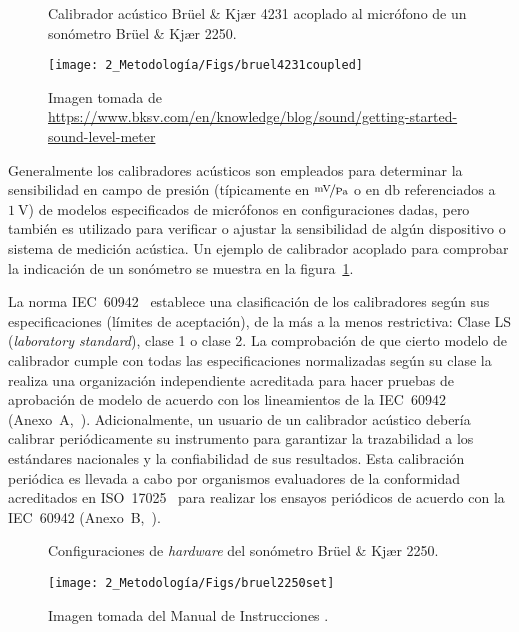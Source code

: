 \begin{figure}[!h]
    \caption{Calibrador acústico Brüel \& Kjær 4231 acoplado al micrófono de un sonómetro Brüel \& Kjær 2250.}
    \label{fig:bruel_4231_coupled}
    \centering
    \texttt{[image: 2\_Metodología/Figs/bruel4231coupled]}
    \caption*{\footnotesize Imagen tomada de \scriptsize \url{https://www.bksv.com/en/knowledge/blog/sound/getting-started-sound-level-meter}}
\end{figure}
%
Generalmente los calibradores acústicos son empleados para determinar la sensibilidad en campo de presión (típicamente en $\nicefrac{\unit{\mV}}{\unit{\Pa}}$ o en $\unit{\decibel}$ referenciados a $\qty{1}{\V}$) de modelos especificados de micrófonos en configuraciones dadas, pero también es utilizado para verificar o ajustar la sensibilidad de algún dispositivo o sistema de medición acústica.
Un ejemplo de calibrador acoplado para comprobar la indicación de un sonómetro se muestra en la figura~\ref{fig:bruel_4231_coupled}.

La norma \mbox{IEC 60942}~\citeyearpar{IEC_TC29_2017} establece una clasificación de los calibradores según sus especificaciones (límites de aceptación), de la más a la menos restrictiva: Clase LS (\emph{laboratory standard}), clase 1 o clase 2.
La comprobación de que cierto modelo de calibrador cumple con todas las especificaciones normalizadas según su clase la realiza una organización independiente acreditada para hacer pruebas de aprobación de modelo de acuerdo con los lineamientos de la \mbox{IEC 60942} (\mbox{Anexo A},~\citeyear{IEC_TC29_2017}).
Adicionalmente, un usuario de un calibrador acústico debería calibrar periódicamente su instrumento para garantizar la trazabilidad a los estándares nacionales y la confiabilidad de sus resultados.
Esta calibración periódica es llevada a cabo por organismos evaluadores de la conformidad acreditados en \mbox{ISO 17025}~\citeyearpar{ISO_CASCO_2017} para realizar los ensayos periódicos de acuerdo con la \mbox{IEC 60942} (\mbox{Anexo B},~\citeyear{IEC_TC29_2017}).
\vfill

\begin{figure}[!hp]
    \caption{Configuraciones de \emph{hardware} del sonómetro Brüel \& Kjær 2250.}
    \label{fig:bruel_2250_set}
    \centering
    \texttt{[image: 2\_Metodología/Figs/bruel2250set]}
    \caption*{\footnotesize Imagen tomada del Manual de Instrucciones .}
\end{figure}

